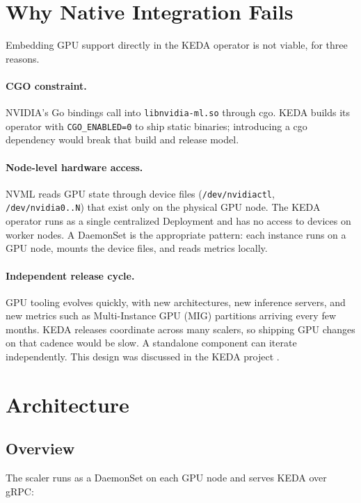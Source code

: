 \documentclass[11pt]{article}
\begin{document}
\section{Why Native Integration Fails}

Embedding GPU support directly in the KEDA operator is not viable, for three
reasons.

\paragraph{CGO constraint.} NVIDIA's Go bindings \cite{gonvml} call into
\texttt{libnvidia-ml.so} through cgo. KEDA builds its operator with
\texttt{CGO\_ENABLED=0} to ship static binaries; introducing a cgo dependency
would break that build and release model.

\paragraph{Node-level hardware access.} NVML reads GPU state through device files
(\texttt{/dev/nvidiactl}, \texttt{/dev/nvidia0..N}) that exist only on the
physical GPU node. The KEDA operator runs as a single centralized Deployment and
has no access to devices on worker nodes. A DaemonSet is the appropriate pattern:
each instance runs on a GPU node, mounts the device files, and reads metrics
locally.

\paragraph{Independent release cycle.} GPU tooling evolves quickly, with new
architectures, new inference servers, and new metrics such as Multi-Instance GPU
(MIG) partitions arriving every few months. KEDA releases coordinate across many scalers, so shipping GPU
changes on that cadence would be slow. A standalone component can iterate
independently. This design was discussed in the KEDA project \cite{keda7538}.

\section{Architecture}

\subsection{Overview}
The scaler runs as a DaemonSet on each GPU node and serves KEDA over gRPC:
\end{document}
